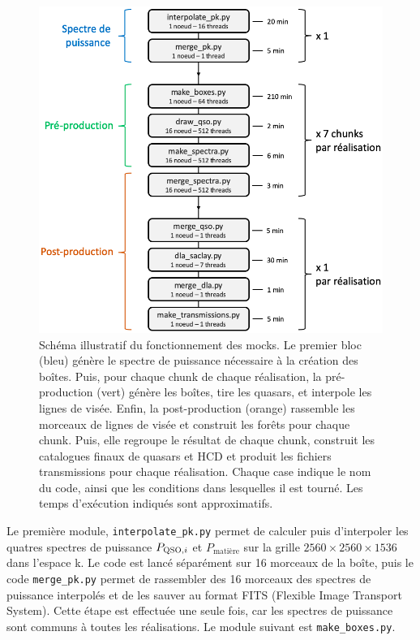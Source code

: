 \begin{figure}
  \centering
  \includegraphics[scale=0.55]{schema_prod}
  \caption{Schéma illustratif du fonctionnement des mocks. Le premier bloc (bleu) génère le spectre de puissance nécessaire à la création des boîtes. Puis, pour chaque chunk de chaque réalisation, la pré-production (vert) génère les boîtes, tire les quasars, et interpole les lignes de visée. Enfin, la post-production (orange) rassemble les morceaux de lignes de visée et construit les forêts \lya{} pour chaque chunk. Puis, elle regroupe le résultat de chaque chunk, construit les catalogues finaux de quasars et HCD et produit les fichiers transmissions pour chaque réalisation. Chaque case indique le nom du code, ainsi que les conditions dans lesquelles il est tourné. Les temps d'exécution indiqués sont approximatifs.}
  \label{fig:schema_prod}
\end{figure}
Le première module, \texttt{interpolate\_pk.py} permet de calculer puis d'interpoler les quatres spectres de puissance $P_{\textsc{QSO},i}$ et $P_{\mathrm{matière}}$ sur la grille $\num{2560}\times\num{2560}\times\num{1536}$ dans l'espace k. Le code est lancé séparément sur 16 morceaux de la boîte, puis le code \texttt{merge\_pk.py} permet de rassembler des 16 morceaux des spectres de puissance interpolés et de les sauver au format FITS (Flexible Image Transport System). Cette étape est effectuée une seule fois, car les spectres de puissance sont communs à toutes les réalisations. Le module suivant est \texttt{make\_boxes.py}.
